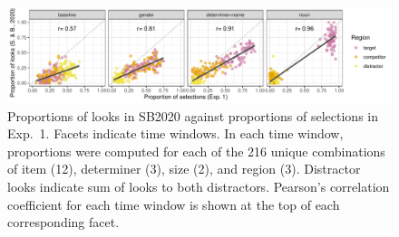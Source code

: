 \documentclass[10pt,letterpaper]{article}
\newcommand{\expref}[1]{Exp.~#1}
\newcommand{\jd}[1]{\textcolor{Red}{\textbf{[jd: #1]}}}
\begin{document}
\begin{figure}[h!]
\centering
\includegraphics[width=.9\textwidth]{../../analysis/SunBreheny/1_incremental/main/graphs/corr-window}
\caption{Proportions of looks in SB2020 against proportions of selections in \expref{1}. Facets indicate time windows. In each time window, proportions were computed for each of the 216 unique combinations of item (12), determiner (3), size (2), and region (3). Distractor looks indicate sum of  looks to both distractors. Pearson's correlation coefficient for each time window is shown at the top of each corresponding facet.} 
\label{fig:corr-window}
\end{figure}

\end{document}

